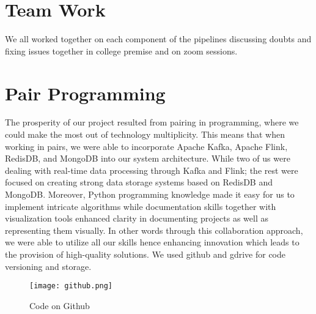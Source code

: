 \documentclass[conference]{IEEEtran}
\begin{document}
\section{Team Work}
\begin{table}[htbp]
\caption{Team Member Roles}
We all worked together on each component of the pipelines discussing doubts and fixing issues together in college premise and on zoom sessions.
\begin{center}
\label{tab:team_roles}
\end{center}
\end{table}

\section{Pair Programming}
The prosperity of our project resulted from pairing in programming, where we could make the most out of technology multiplicity. This means that when working in pairs, we were able to incorporate Apache Kafka, Apache Flink, RedisDB, and MongoDB into our system architecture. While two of us were dealing with real-time data processing through Kafka and Flink; the rest were focused on creating strong data storage systems based on RedisDB and MongoDB. Moreover, Python programming knowledge made it easy for us to implement intricate algorithms while documentation skills together with visualization tools enhanced clarity in documenting projects as well as representing them visually. In other words through this collaboration approach, we were able to utilize all our skills hence enhancing innovation which leads to the provision of high-quality solutions. We used github and gdrive for code versioning and storage.
\begin{figure}[htbp]
\centerline{\texttt{[image: github.png]}}
\caption{Code on Github}
\label{fig}
\end{figure}
\end{document}
